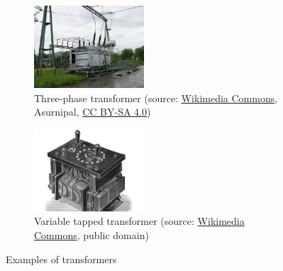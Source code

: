 \begin{frame}
\begin{figure}
		\begin{subfigure}[b]{0.49\textwidth}
			\centering
			\includegraphics[width=0.45\textwidth]{fig/lec04/Three_phase_transformer.jpg}
			\caption{Three-phase transformer (source: \href{https://commons.wikimedia.org/wiki/File:Dornbirn-Umspannwerk_Werben-110kV_FS6-Anlage_Trafo_Elin_220-110kV-01ASD.jpg}{Wikimedia Commons}, Asurnipal, \href{https://creativecommons.org/licenses/by-sa/4.0/deed.en}{CC BY-SA 4.0})}
		\end{subfigure}
		\hfill
		\begin{subfigure}[b]{0.49\textwidth}
			\centering
			\includegraphics[width=0.45\textwidth]{fig/lec04/Tapped_transformer.jpg}
			\caption{Variable tapped transformer (source: \href{https://commons.wikimedia.org/wiki/File:Variable-tap_regulating_transformer_(Rankin_Kennedy,_Electrical_Installations,_Vol_II,_1909).jpg}{Wikimedia Commons}, public domain)}
		\end{subfigure}
		\caption*{Examples of transformers} 
        \label{fig:examples_transformers}
	\end{figure}
\end{frame}

